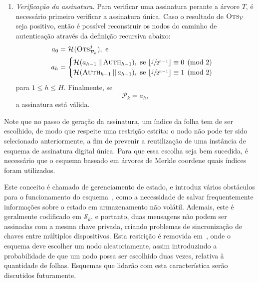 \documentclass{ufsctex/ufsctex}
\newcommand{\pk}{\mathcal{P}_k}
\newcommand{\sk}{\mathcal{S}_k}
\newcommand{\hash}[2][]{\mathcal{H}^{#1} (#2)}
\newcommand{\concat}{\, \vert{} \vert{} \,}
\begin{document}
\begin{enumerate}
  \item[] \emph{Verificação da assinatura.} Para verificar uma assinatura
      perante a árvore $T$, é necessário primeiro verificar a assinatura única.
        Caso o resultado de $\textsc{Ots}_{\mathcal{V}}$ seja positivo, então é
        possível reconstruir os nodos do caminho de autenticação através da
        definição recursiva abaixo:
        \begin{equation}
          \begin{split}
            a_{0} &= \hash{\textsc{Ots}_{\pk{}}^{j}}, \text{ e } \\
            a_{h} &=
            \begin{cases}
              \hash{a_{h - 1} \concat \textsc{Auth}_{h - 1}}, \text{ se }
                \lfloor \sfrac{j}{2^{h - 1}} \rfloor \equiv 0 \pmod{2} \\
              \hash{\textsc{Auth}_{h - 1} \concat a_{h - 1}}, \text{ se }
                \lfloor \sfrac{j}{2^{h - 1}} \rfloor \equiv 1 \pmod{2} \\
            \end{cases}
          \end{split}
        \end{equation}
        para $1 \leq h \leq H$. Finalmente, se
        \begin{equation}
          \pk{} = a_{h},
        \end{equation}
        a assinatura está válida.

\end{enumerate}

Note que no passo de geração da assinatura, um índice da folha tem de ser
escolhido, de modo que respeite uma restrição estrita: o nodo não pode ter sido
selecionado anteriormente, a fim de prevenir a reutilização de uma instância de
esquema de assinatura digital única. Para que essa escolha seja bem sucedida, é
necessário que o esquema baseado em árvores de Merkle coordene quais índices
foram utilizados.

Este conceito é chamado de gerenciamento de estado, e introduz vários
obstáculos para o funcionamento do esquema~\cite{McGrew2016}, como a
necessidade de salvar frequentemente informações sobre o estado em
armazenamento não volátil. Ademais, este é geralmente codificado em $\sk{}$, e
portanto, duas mensagens não podem ser assinadas com a mesma chave privada,
criando problemas de sincronização de chaves entre múltiplos dispositivos. Esta
restrição é removida em~\cite[6.4.16]{Goldreich:2004:FCV:975541}, onde o
esquema deve escolher um nodo aleatoriamente, assim introduzindo a
probabilidade de que um nodo possa ser escolhido duas vezes, relativa à
quantidade de folhas. Esquemas que lidarão com esta característica serão
discutidos futuramente.
\end{document}
